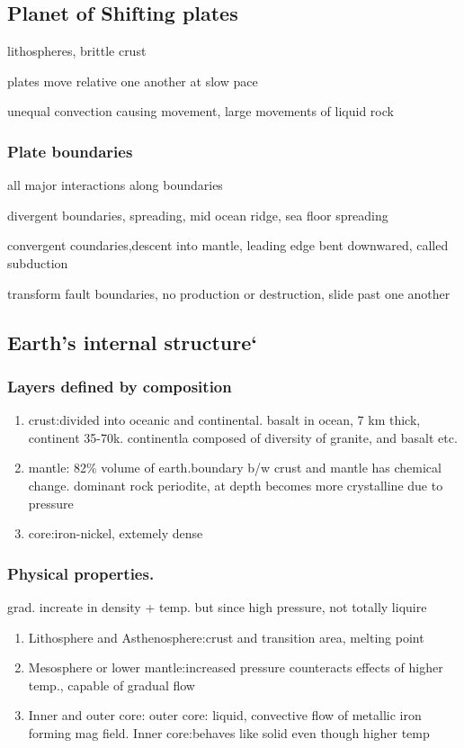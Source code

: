 \documentclass[11pt]{amsart}
\begin{document}
  \subsection{Planet of Shifting plates}
  \par lithospheres, brittle crust
  \par plates move relative one another at slow pace
  \par unequal convection causing movement, large movements of liquid rock
  \subsubsection{Plate boundaries}
  \par all major interactions along boundaries
  \par divergent boundaries, spreading, mid ocean ridge, sea floor spreading
  \par convergent coundaries,descent into mantle, leading edge bent downwared,
  called subduction
  \par transform fault boundaries, no production or destruction, slide past one
  another
  \subsection{Earth's internal structure`}
  \subsubsection{Layers defined by composition}
  \begin{enumerate}
    \item crust:divided into oceanic and continental. basalt in ocean, 7 km
      thick, continent 35-70k. continentla composed of diversity of granite,
      and basalt etc.
    \item mantle: 82\% volume of earth.boundary b/w crust and mantle has
      chemical change. dominant rock periodite, at depth becomes more
      crystalline due to pressure
    \item core:iron-nickel, extemely dense
  \end{enumerate}
  \subsubsection{Physical properties.}
  \par grad. increate in density + temp. but since high pressure, not totally
  liquire
  \begin{enumerate}
    \item Lithosphere and Asthenosphere:crust and transition area, melting
      point
    \item Mesosphere or lower mantle:increased pressure counteracts effects of
      higher temp., capable of gradual flow
    \item Inner and outer core: outer core: liquid, convective flow of
      metallic iron forming mag field. Inner core:behaves like solid even
      though higher temp
  \end{enumerate}
\end{document}
